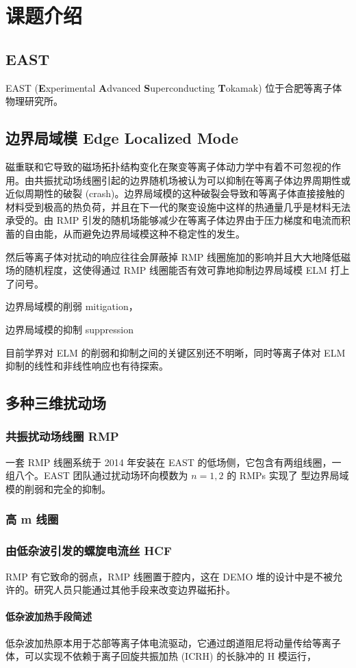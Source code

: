 \chapter{课题介绍}

\section{EAST}
EAST (\textbf{E}xperimental \textbf{A}dvanced \textbf{S}uperconducting \textbf{T}okamak) 位于合肥等离子体物理研究所。

\section{边界局域模 Edge Localized Mode}
磁重联和它导致的磁场拓扑结构变化在聚变等离子体动力学中有着不可忽视的作用。由共振扰动场线圈引起的边界随机场被认为可以抑制在等离子体边界周期性或近似周期性的破裂 (crash)。边界局域模的这种破裂会导致和等离子体直接接触的材料受到极高的热负荷，并且在下一代的聚变设施中这样的热通量几乎是材料无法承受的。由 RMP 引发的随机场能够减少在等离子体边界由于压力梯度和电流而积蓄的自由能，从而避免边界局域模这种不稳定性的发生。

然后等离子体对扰动的响应往往会屏蔽掉 RMP 线圈施加的影响并且大大地降低磁场的随机程度，这使得通过 RMP 线圈能否有效可靠地抑制边界局域模 ELM 打上了问号。

边界局域模的削弱 mitigation，

边界局域模的抑制 suppression

目前学界对 ELM 的削弱和抑制之间的关键区别还不明晰，同时等离子体对 ELM 抑制的线性和非线性响应也有待探索。

\section{多种三维扰动场}
\subsection{共振扰动场线圈 RMP}

一套 RMP 线圈系统于 2014 年安装在 EAST 的低场侧，它包含有两组线圈，一组八个。EAST 团队通过扰动场环向模数为 $n=1, 2$ 的 RMPs 实现了  型边界局域模的削弱和完全的抑制。
\subsection{高 m 线圈}

\subsection{由低杂波引发的螺旋电流丝 HCF}
RMP 有它致命的弱点，RMP 线圈置于腔内，这在 DEMO 堆的设计中是不被允许的。研究人员只能通过其他手段来改变边界磁拓扑。 
\subsubsection{低杂波加热手段简述}
低杂波加热原本用于芯部等离子体电流驱动，它通过朗道阻尼将动量传给等离子体，可以实现不依赖于离子回旋共振加热 (ICRH) 的长脉冲的 H 模运行，